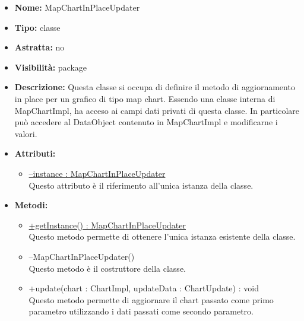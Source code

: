 	
			
			\begin{itemize}
			\item \textbf{Nome:} MapChartInPlaceUpdater
			\item \textbf{Tipo:} classe
			
		\item \textbf{Astratta:}
		no
			\item \textbf{Visibilità:} package
			\item \textbf{Descrizione:} Questa classe si occupa di definire il metodo di aggiornamento in place per un grafico di tipo map chart. Essendo una classe interna di MapChartImpl, ha acceso ai campi dati privati di questa classe. In particolare può accedere al DataObject contenuto in MapChartImpl e modificarne i valori.
			\item \textbf{Attributi:}
				\begin{itemize}
				\setlength{\itemsep}{5pt}
				
					\item[\ding{111}] \underline{--instance : MapChartInPlaceUpdater} \\ [1mm] Questo attributo è il riferimento all'unica istanza della classe.
				\end{itemize}
		
			\item \textbf{Metodi:}
				\begin{itemize}
				\setlength{\itemsep}{5pt}
				
					\item[\ding{111}] {\underline{+getInstance() : MapChartInPlaceUpdater}} \\ [1mm] Questo metodo permette di ottenere l'unica istanza esistente della classe.
					\item[\ding{111}] {{--MapChartInPlaceUpdater()}} \\ [1mm] Questo metodo è il costruttore della classe.
					\item[\ding{111}] {{+update(chart : ChartImpl, updateData : ChartUpdate) : void}} \\ [1mm] Questo metodo permette di aggiornare il chart passato come primo parametro utilizzando i dati passati come secondo parametro.
				\end{itemize}
		
			\end{itemize}

